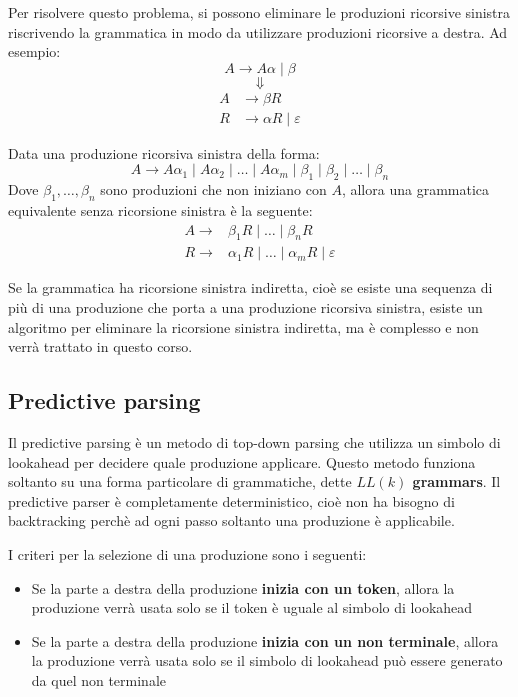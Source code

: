\documentclass[a4paper]{article}
\begin{document}
Per risolvere questo problema, si possono eliminare le produzioni ricorsive sinistra
riscrivendo la grammatica in modo da utilizzare produzioni ricorsive a destra. Ad esempio:
\[
  A \to A \alpha \mid \beta
\] 
\[
  \Downarrow
\] 
\[
  \begin{aligned}
    A &\to \beta R \\
    R &\to \alpha R \mid \varepsilon
  \end{aligned}
\] 

\begin{definition}
  Data una produzione ricorsiva sinistra della forma:
  \[
    A \to A \alpha_1 \mid A \alpha_2 \mid \ldots \mid A \alpha_m
    \mid \beta_1 \mid \beta_2 \mid \ldots \mid \beta_n
  \] 
  Dove \( \beta_1, \ldots, \beta_n \) sono produzioni che non iniziano con \( A \),
  allora una grammatica equivalente senza ricorsione sinistra è la seguente:
  \[
    \begin{aligned}
      A \to &\beta_1 R \mid \ldots \mid \beta_n R \\
      R \to &\alpha_1 R \mid \ldots \mid \alpha_m R \mid \varepsilon
    \end{aligned}
  \] 
\end{definition}

\noindent
Se la grammatica ha ricorsione sinistra indiretta, cioè se esiste una sequenza di
più di una produzione che porta a una produzione ricorsiva sinistra, esiste un algoritmo
per eliminare la ricorsione sinistra indiretta, ma è complesso e non verrà trattato in
questo corso.

\subsection{Predictive parsing}
Il predictive parsing è un metodo di top-down parsing che utilizza un simbolo di
lookahead per decidere quale produzione applicare. Questo metodo funziona soltanto
su una forma particolare di grammatiche, dette \textbf{\( LL(k) \) grammars}.
Il predictive parser è completamente deterministico, cioè non ha bisogno di backtracking
perchè ad ogni passo soltanto una produzione è applicabile.

I criteri per la selezione di una produzione sono i seguenti:
\begin{itemize}
  \item Se la parte a destra della produzione \textbf{inizia con un token}, allora 
    la produzione verrà usata solo se il token è uguale al simbolo di lookahead

  \item Se la parte a destra della produzione \textbf{inizia con un non terminale},
    allora la produzione verrà usata solo se il simbolo di lookahead può essere
    generato da quel non terminale
\end{itemize}
\end{document}
